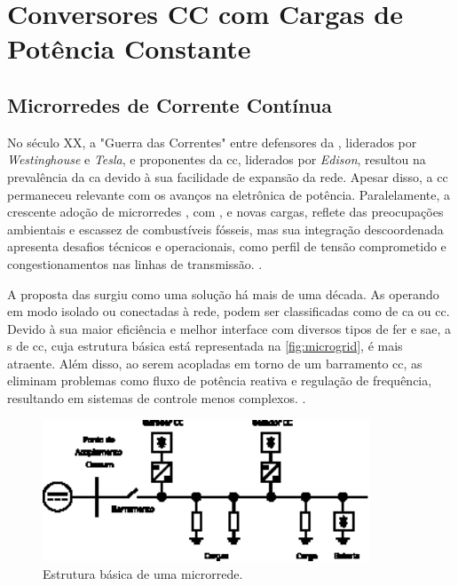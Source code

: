 \chapter{Conversores CC com Cargas de Potência Constante} \label{cap3}

\section{Microrredes de Corrente Contínua}

No século XX, a "Guerra das Correntes" entre defensores da , liderados por \textit{Westinghouse} e \textit{Tesla}, e proponentes da \acrshort{cc}, liderados por \textit{Edison}, resultou na prevalência da \acrshort{ca} devido à sua facilidade de expansão da rede. Apesar disso, a \acrshort{cc} permaneceu relevante com os avanços na eletrônica de potência. Paralelamente, a crescente adoção de microrredes , com ,  e novas cargas, reflete das preocupações ambientais e escassez de combustíveis fósseis, mas sua integração descoordenada apresenta desafios técnicos e operacionais, como perfil de tensão comprometido e congestionamentos nas linhas de transmissão. \cite{Elsayed2015, Dragicevic2015}.

A proposta das  surgiu como uma solução há mais de uma década. As  operando em modo isolado ou conectadas à rede, podem ser classificadas como  de \acrshort{ca} ou \acrshort{cc}. Devido à sua maior eficiência e melhor interface com diversos tipos de \acrshort{fer} e \acrshort{sae}, a s de \acrshort{cc}, cuja estrutura básica está representada na \autoref{fig:microgrid}, é mais atraente. Além disso, ao serem acopladas em torno de um barramento \acrshort{cc}, as  eliminam problemas como fluxo de potência reativa e regulação de frequência, resultando em sistemas de controle menos complexos. \cite{Dragicevic2015}.

\begin{figure}[H]
  \centering
  \includegraphics[width=0.87\textwidth]{figuras/microgrid.eps}
  \caption{Estrutura básica de uma microrrede.}
  \label{fig:microgrid}
\end{figure}

